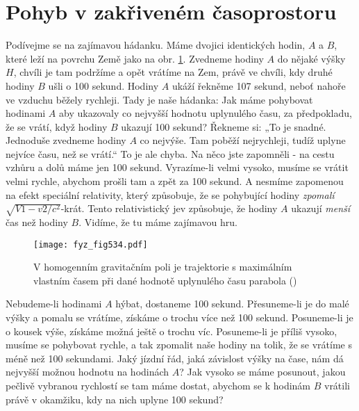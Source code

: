 {  \section{Pohyb v zakřiveném časoprostoru}\label{fyz:IIchapXVLIIsecVIII}
    Podívejme se na zajímavou hádanku. Máme dvojici identických hodin, \(A\) a \(B\), které leží na 
    povrchu Země jako na obr. \ref{fyz:fig534}. Zvedneme hodiny \(A\) do nějaké výšky \(H\), chvíli 
    je tam podržíme a opět vrátíme na Zem, právě ve chvíli, kdy druhé hodiny \(B\) ušli o \num{100} 
    sekund. Hodiny \(A\) ukáží řekněme \num{107} sekund, neboť nahoře ve vzduchu běžely rychleji. 
    Tady je naše hádanka: Jak máme pohybovat hodinami \(A\) aby ukazovaly co nejvyšší hodnotu 
    uplynulého času, za předpokladu, že se vrátí, když hodiny \(B\) ukazují \num{100} sekund? 
    Řekneme si: „To je snadné. Jednoduše zvedneme hodiny \(A\) co nejvýše. Tam poběží nejrychleji, 
    tudíž uplyne nejvíce času, než se vrátí.“ To je ale chyba. Na něco jste zapomněli - na cestu 
    vzhůru a dolů máme jen \num{100} sekund. Vyrazíme-li velmi vysoko, musíme se vrátit velmi 
    rychle, abychom prošli tam a zpět za \num{100} sekund. A nesmíme zapomenou na efekt speciální 
    relativity, který způsobuje, že se pohybující hodiny \emph{zpomalí} \(\sqrt{V1 - 
    v2/c^2}\)-krát. Tento relativistický jev způsobuje, že hodiny \(A\) ukazují \emph{menší} čas 
    než hodiny \(B\). Vidíme, že tu máme zajímavou hru.
    
    \begin{figure}[ht!] %
      \centering
      \texttt{[image: fyz\_fig534.pdf]}
      \caption{V homogenním gravitačním poli je trajektorie s maximálním vlastním časem při dané 
               hodnotě uplynulého času parabola
               (\cite[s.~791]{Feynman02})}
      \label{fyz:fig534}
    \end{figure}
    
    Nebudeme-li hodinami \(A\) hýbat, dostaneme \num{100} sekund. Přesuneme-li je do malé výšky a 
    pomalu se vrátíme, získáme o trochu více než \num{100} sekund. Posuneme-li je o kousek výše, 
    získáme možná ještě o trochu víc. Posuneme-li je příliš vysoko, musíme se pohybovat rychle, a 
    tak zpomalit naše hodiny na tolik, že se vrátíme s méně než \num{100} sekundami. Jaký jízdní 
    řád, jaká závislost výšky na čase, nám dá nejvyšší možnou hodnotu na hodinách \(A\)? Jak vysoko 
    se máme posunout, jakou pečlivě vybranou rychlostí se tam máme dostat, abychom se k hodinám 
    \(B\) vrátili právě v okamžiku, kdy na nich uplyne \num{100} sekund?
    
}
